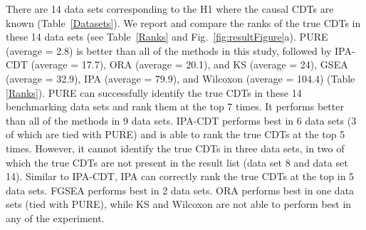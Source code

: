 \documentclass[Minh_PhD_thesis.tex]{subfiles}
\begin{document}
There are 14 data sets corresponding to the H1 where the causal CDTs are known (Table~\ref{Datasets}). We report and compare the ranks of the true CDTs in these 14 data sets (see Table~\ref{Ranks} and Fig.~\ref{fig:resultFigure}a).
PURE (average = 2.8) is better than all of the methods in this study, followed by IPA-CDT (average = 17.7), ORA (average = 20.1), and KS (average = 24), GSEA (average = 32.9), IPA (average = 79.9), and Wilcoxon (average = 104.4) (Table \ref{Ranks}). PURE can successfully identify the true CDTs in these 14 benchmarking data sets and rank them at the top 7 times. It performs better than all of the methods in 9 data sets. IPA-CDT performs best in 6 data sets (3 of which are tied with PURE) and is able to rank the true CDTs at the top 5 times. However, it cannot identify the true CDTs in three data sets, in two of which the true CDTs are not present in the result list (data set 8 and data set 14). Similar to IPA-CDT, IPA can correctly rank the true CDTs at the top in 5 data sets.  FGSEA performs best in 2 data sets. ORA performs best in one data sets (tied with PURE), while KS and Wilcoxon are not able to perform best in any of the experiment.

\end{document}
